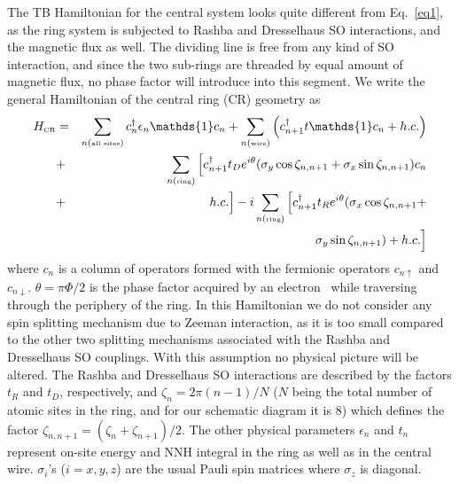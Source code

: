 \documentclass[doublecol]{epl2}
\begin{document}
The TB Hamiltonian for the central system looks quite different from 
Eq.~\ref{eq1}, as the ring system is subjected to Rashba and Dresselhaus 
SO interactions, and the magnetic flux as well. The dividing line is free from 
any kind of SO interaction, and since the two sub-rings are threaded by equal
amount of magnetic flux, no phase factor will introduce into this segment.  
We write the general Hamiltonian of the central ring (CR) geometry 
as~\cite{ham1,ham2,ham3,ham4}
\begin{eqnarray}
H_{\mbox{\tiny CR}}
&=& \sum\limits_{n (\mbox{\tiny all sites})} c_n^\dagger
\epsilon_n \mathds{1} c_n + \sum\limits_{n (\mbox{\tiny wire})}
\left(c_{n+1}^\dagger t \mathds{1} c_n + h.c.\right) \nonumber \\
& + &\sum\limits_{n (\mbox{\tiny ring})}\Big[c_{n+1}^\dagger
t_D e^{i\theta}(\mbox{$\sigma_y$}\cos\zeta_{n,n+1} 
+\mbox{$\sigma_x$}\sin\zeta_{n,n+1})c_n\nonumber \\
&+& h.c. \Big] - i\sum\limits_{n (\mbox{\tiny ring})}
\Big[c_{n+1}^\dagger t_R e^{i\theta}(\mbox{$\sigma_x$}\cos
\zeta_{n,n+1}+ \nonumber \\
& & \mbox{$\sigma_y$} \sin \zeta_{n,n+1}) + h.c.\Big]
\label{eq2}
\end{eqnarray}
where $c_n$ is a column of operators formed with the fermionic operators
$c_{n\uparrow}$ and $c_{n\downarrow}$. $\theta=\pi \Phi/2$ is the phase 
factor acquired by an electron~\cite{ph} while traversing through the 
periphery of the ring. In this Hamiltonian we do not consider any spin
splitting mechanism due to Zeeman interaction, as it is too small compared
to the other two splitting mechanisms associated with the Rashba and 
Dresselhaus SO couplings. With this assumption no physical picture will 
be altered. 
The Rashba and Dresselhaus SO interactions are described by the factors 
$t_R$ and $t_D$, respectively, and $\zeta_n=2\pi(n-1)/N$ ($N$ being the 
total number of atomic sites in the ring, and for our schematic diagram it 
is $8$) which defines the factor $\zeta_{n,n+1}=(\zeta_n+\zeta_{n+1})/2$. The
other physical parameters $\epsilon_n$ and $t_n$ represent on-site energy and 
NNH integral in the ring as well as in the central wire. 
$\sigma_i$'s ($i=x,y,z$) are the usual Pauli spin matrices where $\sigma_z$ 
is diagonal.
\end{document}
